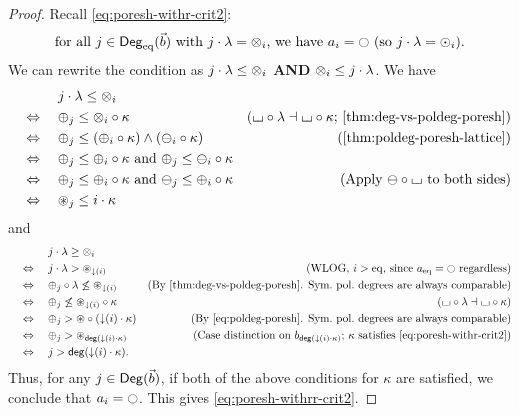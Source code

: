\documentclass[a4paper]{memoir}
\begin{document}
\begin{proof}
	Recall \cref{eq:poresh-withr-crit2}:
	\[
		\text{for all } j \in \Degeq(\vec b) \text{ with } j \cdot \lambda = \mixpol_i \text{, we have } a_i = \npolar \text{ (so $j \cdot \lambda = \nonpol_i$)}.
	\]
	We can rewrite the condition as $j \cdot \lambda \leq {\otimes}_i$ \textbf{AND} ${\otimes}_i \leq j \cdot \lambda$. We have
	\begin{align*}
		&\quad\mathrel{\phantom{\Leftrightarrow}}\quad
		j \cdot \lambda \leq \mixpol_i
		\\ &\quad\Leftrightarrow\quad
		\pospol_j \leq \mixpol_i \circ \kappa
		& \text{($\loch\circ  \lambda \dashv \loch \circ \kappa$; \cref{thm:deg-vs-poldeg-poresh})}
		\\ &\quad\Leftrightarrow\quad
		\pospol_j \leq (\pospol_i \circ \kappa) \wedge (\negpol_i \circ \kappa)
		& \text{(\cref{thm:poldeg-poresh-lattice})}
		\\ &\quad\Leftrightarrow\quad
		\pospol_j \leq \pospol_i \circ \kappa \text{ and }
		\pospol_j \leq \negpol_i \circ \kappa
		\\ &\quad\Leftrightarrow\quad
		\pospol_j \leq \pospol_i \circ \kappa \text{ and }
		\negpol_j \leq \pospol_i \circ \kappa
		& \text{(Apply $\negpol \circ \loch$ to both sides)}
		\\ &\quad\Leftrightarrow\quad
		\isopol_j \leq i \cdot \kappa
	\end{align*}
	and
	\begin{align*}
		&\quad\mathrel{\phantom{\Leftrightarrow}}\quad
		j \cdot \lambda \geq \mixpol_i
		\\ &\quad\Leftrightarrow\quad
		j \cdot \lambda > \isopol_{\predeg(i)}
		&\text{(WLOG, $i > \eqtydeg$, since $a_\eqtydeg = \npolar$ regardless)}
		\\ &\quad\Leftrightarrow\quad
		\pospol_j \circ \lambda \not\leq \isopol_{\predeg(i)}
		& \text{(By \cref{thm:deg-vs-poldeg-poresh}. Sym.\ pol.\ degrees are always comparable)}
		\\ &\quad\Leftrightarrow\quad
		\pospol_j \not\leq \isopol_{\predeg(i)} \circ \kappa
		& \text{($\loch\circ  \lambda \dashv \loch \circ \kappa$)}
		\\ &\quad\Leftrightarrow\quad
		\pospol_j > \isopol \circ (\predeg(i) \cdot \kappa)
		& \text{(By \cref{eq:poldeg-poresh}. Sym.\ pol.\ degrees are always comparable)}
		\\ &\quad\Leftrightarrow\quad
		\pospol_j > \isopol_{\getdeg(\predeg(i) \cdot \kappa)}
		& \text{(Case distinction on $b_{\getdeg(\predeg(i) \cdot \kappa)}$; $\kappa$ satisfies \cref{eq:poresh-withr-crit2})}
		\\ &\quad\Leftrightarrow\quad
		j > \getdeg(\predeg(i) \cdot \kappa).
	\end{align*}
	Thus, for any $j \in {\mathsf{Deg}}(\vec b)$, if both of the above conditions for $\kappa$ are satisfied, we conclude that $a_i = \npolar$. This gives \cref{eq:poresh-withrr-crit2}.
\end{proof}
\end{document}
